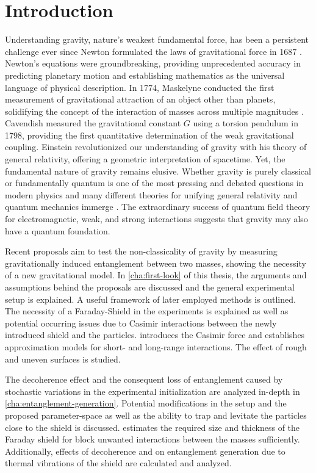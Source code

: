 \chapter{Introduction}\label{cha:introduction}

Understanding gravity, nature's weakest fundamental force, has been a persistent challenge ever since Newton formulated the laws of gravitational force in 1687 \cite{Newton_1687}.
Newton's equations were groundbreaking, providing unprecedented accuracy in predicting planetary motion and establishing mathematics as the universal language of physical description.
In 1774, Maskelyne conducted the first measurement of gravitational attraction of an object other than planets, solidifying the concept of the interaction of masses across multiple magnitudes \cite{Maskelyne_1775,Davies_1985}. 
Cavendish measured the gravitational constant $G$ using a torsion pendulum in 1798, providing the first quantitative determination of the weak gravitational coupling.
Einstein revolutionized our understanding of gravity with his theory of general relativity, offering a geometric interpretation of spacetime. Yet, the fundamental nature of gravity remains elusive. Whether gravity is purely classical or fundamentally quantum is one of the most pressing and debated questions in modern physics and many different theories for unifying general relativity and quantum mechanics immerge \cite{Becker_2007, Ashtekar_1986, Oppenheim_2023}.
The extraordinary success of quantum field theory for electromagnetic, weak, and strong interactions suggests that gravity may also have a quantum foundation.

Recent proposals \cite{Bose_2017,Marletto_2017} aim to test the non-classicality of gravity by measuring gravitationally induced entanglement between two masses, showing the necessity of a new gravitational model.
In \cref{cha:first-look} of this thesis, the arguments and assumptions behind the proposals are discussed and the general experimental setup is explained. A useful framework of later employed methods is outlined.
The necessity of a Faraday-Shield in the experiments is explained as well as potential occurring issues due to Casimir interactions between the newly introduced shield and the particles.
 introduces the Casimir force and establishes approximation models for short- and long-range interactions. The effect of rough and uneven surfaces is studied.

The decoherence effect and the consequent loss of entanglement caused by stochastic variations in the experimental initialization are analyzed in-depth in \cref{cha:entanglement-generation}. Potential modifications in the setup and the proposed parameter-space as well as the ability to trap and levitate the particles close to the shield is discussed. 
 estimates the required size and thickness of the Faraday shield for block unwanted interactions between the masses sufficiently. Additionally, effects of decoherence and on entanglement generation due to thermal vibrations of the shield are calculated and analyzed.